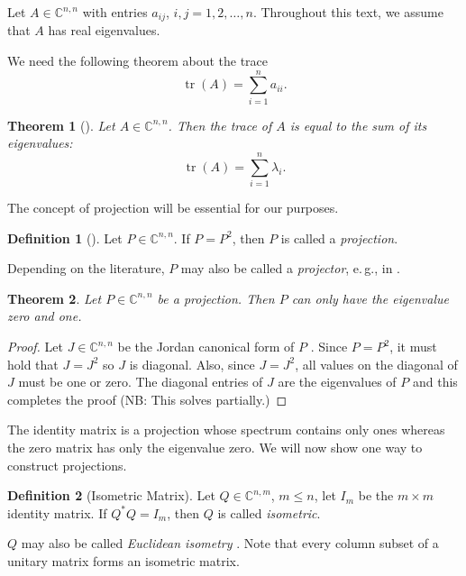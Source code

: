 \documentclass[%
	paper=a4,
	fontsize=10pt,
	DIV11,BCOR10mm,
	numbers=noenddot,
	abstract=yes
]{scrartcl}
\newcommand{\F}{\mathbb{C}}
\newtheorem{theorem}{Theorem}[section]
\theoremstyle{definition}
\newtheorem{definition}{Definition}[section]
\begin{document}
Let $A \in \F^{n,n}$ with entries $a_{ij}$, $i,j = 1, 2, \dotsc, n$. Throughout
this text, we assume that $A$ has real eigenvalues.

We need the following theorem about the trace
\[ \operatorname{tr}(A) = \sum_{i=1}^n a_{ii}. \]

\begin{theorem}[{\cite[§2.4.1]{Horn2012}}]
	Let $A \in \F^{n,n}$. Then the trace of $A$ is equal to the sum of its
	eigenvalues:
	\[ \operatorname{tr}(A) = \sum_{i=1}^n \lambda_i. \]
\end{theorem}

The concept of projection will be essential for our purposes.

\begin{definition}[{\cite[§0.9.13]{Horn2012}}]
	Let $P \in \F^{n,n}$. If $P = P^2$, then $P$ is called a \emph{projection}.
\end{definition}

Depending on the literature, $P$ may also be called a \emph{projector}, e.\,g.,
in \cite{Polizzi2009}.

\begin{theorem}
	Let $P \in \F^{n,n}$ be a projection. Then $P$ can only have the eigenvalue
	zero and one.
\end{theorem}

\begin{proof}
	Let $J \in \F^{n,n}$ be the Jordan canonical form of $P$
	\cite[§3.1]{Horn2012}. Since $P = P^2$, it must hold that $J = J^2$ so $J$
	is diagonal. Also, since $J = J^2$, all values on the diagonal of $J$ must
	be one or zero. The diagonal entries of $J$ are the eigenvalues of $P$ and
	this completes the proof (NB: This solves \cite[3.3P3]{Horn2012} partially.)
\end{proof}

The identity matrix is a projection whose spectrum contains only ones whereas
the zero matrix has only the eigenvalue zero. We will now show one way to
construct projections.

\begin{definition}[Isometric Matrix]
	Let $Q \in \F^{n,m}$, $m \leq n$, let $I_m$ be the $m \times m$ identity
	matrix. If $Q^* Q = I_m$, then $Q$ is called \emph{isometric}.
\end{definition}

$Q$ may also be called \emph{Euclidean isometry}
\cite[Definition~2.1.5]{Horn2012}. Note that every column subset of a unitary
matrix forms an isometric matrix.
\end{document}
